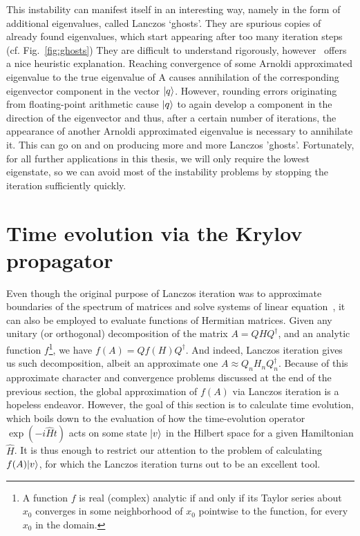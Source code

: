 This instability can manifest itself in an interesting way, namely in the form of additional eigenvalues, called Lanczos `ghosts'.
They are spurious copies of already found eigenvalues, which start appearing after too many iteration steps (cf. Fig.~\ref{fig:ghosts})
They are difficult to understand rigorously, however~\textcite{Trefethen1997} offers a nice heuristic explanation.
Reaching convergence of some Arnoldi approximated eigenvalue to the true eigenvalue of A causes annihilation
of the corresponding eigenvector component in the vector \(\ket{q}\). However, rounding errors originating from
floating-point arithmetic cause \(\ket{q}\) to again develop a component in the direction of the eigenvector
and thus, after a certain number of iterations, the appearance of another Arnoldi approximated eigenvalue is necessary
to annihilate it. This can go on and on producing more and more Lanczos 'ghosts'.
Fortunately, for all further applications in this thesis, we will only require the lowest eigenstate, so we can
avoid most of the instability problems by stopping the iteration sufficiently quickly.

\section{Time evolution via the Krylov propagator}

Even though the original purpose of Lanczos iteration was to approximate boundaries of the spectrum of matrices and
solve systems of linear equation~\autocite{Simoncini2016, Shewchuk1994}, it can also be employed to evaluate functions
of Hermitian matrices. Given any unitary (or orthogonal) decomposition of the matrix \(A = QHQ^{\dagger}\), and an analytic
function \(f\)\footnote{A function \(f\) is real (complex) analytic if and only if its Taylor series about \(x_0\)
	converges in some neighborhood of \(x_0\) pointwise to the function, for every \(x_0\) in the domain.}, we have
\(f(A) = Qf(H)Q^{\dagger}\). And indeed, Lanczos iteration gives us such decomposition, albeit an approximate one
\(A \approx Q_n H_n Q_n^{\dagger}\). Because of this approximate character and convergence problems discussed at
the end of the previous section, the global approximation of \(f(A)\) via Lanczos iteration is a hopeless endeavor.
However, the goal of this section is to calculate time evolution, which boils down to the evaluation of how the time-evolution
operator \(\exp\left(-i \hat{H} t\right) \) acts on some state \(\ket{v}\) in the Hilbert space for a given
Hamiltonian \(\hat{H}\). It is thus enough to restrict our attention to the problem of calculating \(f(A){\ket{v}}\), for
which the Lanczos iteration turns out to be an excellent tool.

